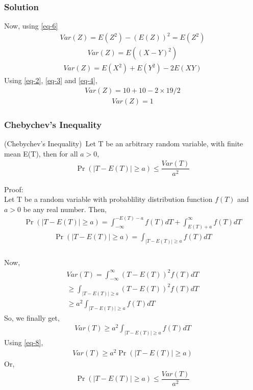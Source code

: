 \documentclass{beamer}
\providecommand{\pr}[1]{\ensuremath{\Pr\left(#1\right)}}
\begin{document}
\begin{frame}
\frametitle{Solution}
Now, using \eqref{eq-6}
\begin{align}
    Var(Z)=E(Z^2)-(E(Z))^2=E(Z^2)
\end{align}
\begin{align}
    Var(Z)=E((X-Y)^2)
\end{align}
\begin{align}
    Var(Z)=E(X^2)+E(Y^2)-2E(XY)
\end{align}
Using \eqref{eq-2}, \eqref{eq-3} and \eqref{eq-4},
\begin{align}
    Var(Z)=10+10-2 \times 19/2
\end{align}
\begin{align} \label{eq-7}
    Var(Z)=1
\end{align}
\end{frame}
\begin{frame}
\frametitle{Chebychev's Inequality}
\begin{theorem}
(Chebychev's Inequality)\ Let T be an arbitrary random variable, with finite mean E(T), then for all $a>0$,
\begin{align}
    \pr{|T-E(T)| \geq a} \leq \dfrac{Var(T)}{a^2}
\end{align}
\end{theorem}

Proof: \\
Let T be a random variable with probablility distribution function $f(T)$ and $a>0$ be any real number.
Then,
\begin{align}
    \pr{|T-E(T)| \geq a}= \int_{-\infty}^{-E(T)-a}f(T)dT +  \int_{E(T)+a}^{\infty}f(T)dT
\end{align}
\begin{align} \label{eq-8}
    \pr{|T-E(T)| \geq a}= \int_{|T-E(T)| \geq a}f(T)dT
\end{align}
\end{frame}
\begin{frame}
\frametitle{}
Now,
\begin{align}
    Var(T)= \int_{-\infty}^{\infty}(T-E(T))^2f(T)dT \nonumber \\ \geq \int_{|T-E(T)|\geq a}(T-E(T))^2f(T)dT \nonumber \\ \geq a^2\int_{|T-E(T)|\geq a}f(T)dT
\end{align}
So, we finally get,
\begin{align}
    Var(T) \geq a^2\int_{|T-E(T)|\geq a}f(T)dT
\end{align}
Using \eqref{eq-8},
\begin{align}
    Var(T) \geq a^2\pr{|T-E(T)| \geq a}
\end{align}
Or,
\begin{align}
    \pr{|T-E(T)| \geq a} \leq \dfrac{Var(T)}{a^2}
\end{align}
\end{frame}
\end{document}
